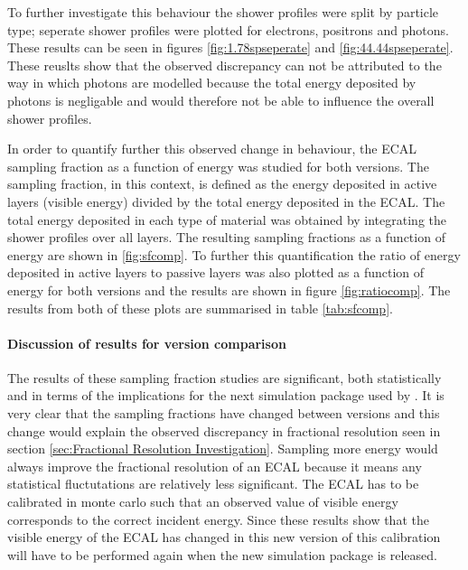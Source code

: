 To further investigate this behaviour the shower profiles were split by particle type; seperate shower profiles were plotted for electrons, positrons and photons.  These results can be seen in figures \ref{fig:1.78spseperate}  and \ref{fig:44.44spseperate}.
These reuslts show that the observed discrepancy can not be attributed to the way in which photons are modelled because the total energy deposited by photons is negligable and would therefore not be able to influence the overall shower profiles.

In order to quantify further this observed change in behaviour, the ECAL sampling fraction as a function of energy was studied for both \geant versions.  The sampling fraction, in this context, is defined as the energy deposited in active layers (visible energy) divided by the total energy deposited in the ECAL.  The total energy deposited in each type of material was obtained by integrating the shower profiles over all layers.  The resulting sampling fractions as a function of energy are shown in \ref{fig:sfcomp}. To further this quantification the ratio of energy deposited in active layers to passive layers was also plotted as a function of energy for both \geant versions and the results are shown in figure \ref{fig:ratiocomp}.  The results from both of these plots are summarised in table \ref{tab:sfcomp}.

\paragraph{Discussion of results for \geant version comparison}
\label{sec:Discussionofresultsone}
The results of these sampling fraction studies are significant, both statistically and in terms of the implications for the next simulation package used by \lhcb.  It is very clear that the sampling fractions have changed between \geant versions and this change would explain the observed discrepancy in fractional resolution seen in section \ref{sec:Fractional Resolution Investigation}.  Sampling more energy would always improve the fractional resolution of an ECAL because it means any statistical fluctutations are relatively less significant. The ECAL has to be calibrated in monte carlo such that an observed value of visible energy corresponds to the correct incident energy.  Since these results show that the visible energy of the ECAL has changed in this new version of \geant this calibration will have to be performed again when the new simulation package is released.

